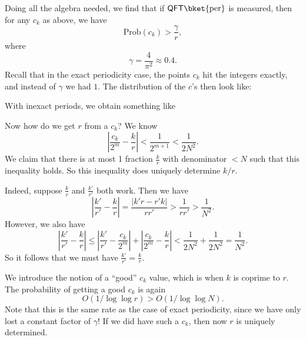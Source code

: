 \documentclass[a4paper]{article}
\newcommand{\qQFT}{\mathsf{QFT}}
\begin{document}
Doing all the algebra needed, we find that if $\qQFT\bket{\mathrm{per}}$ is measured, then for any $c_k$ as above, we have
\[
  \mathrm{Prob}(c_k) > \frac{\gamma}{r},
\]
where
\[
  \gamma = \frac{4}{\pi^2} \approx 0.4.
\]
Recall that in the exact periodicity case, the points $c_k$ hit the integers exactly, and instead of $\gamma$ we had $1$. The distribution of the $c$'s then look like:
\begin{center}
\end{center}
With inexact periods, we obtain something like
\begin{center}
\end{center}
Now how do we get $r$ from a $c_k$? We know
\[
  \left| \frac{c_k}{2^m} - \frac{k}{r}\right| < \frac{1}{2^{m + 1}} < \frac{1}{2N^2}.
\]
We claim that there is at most 1 fraction $\frac{k}{r}$ with denominator $< N$ such that this inequality holds. So this inequality does uniquely determine $k/r$.

Indeed, suppose $\frac{k}{r}$ and $\frac{k'}{r'}$ both work. Then we have
\[
  \left|\frac{k'}{r'} - \frac{k}{r}\right| = \frac{|k'r - r'k|}{rr'} > \frac{1}{rr'} > \frac{1}{N^2}.
\]
However, we also have
\[
  \left|\frac{k'}{r'} - \frac{k}{r}\right| \leq \left|\frac{k'}{r'} - \frac{c_k}{2^m}\right| + \left|\frac{c_k}{2^m} - \frac{k}{r}\right| < \frac{1}{2N^2} + \frac{1}{2N^2} = \frac{1}{N^2}.
\]
So it follows that we must have $\frac{k'}{r'} = \frac{k}{r}$.

We introduce the notion of a ``good'' $c_k$ value, which is when $k$ is coprime to $r$. The probability of getting a good $c_k$ is again
\[
  O(1/\log \log r) > O(1/\log \log N).
\]
Note that this is the same rate as the case of exact periodicity, since we have only lost a constant factor of $\gamma$! If we did have such a $c_k$, then now $r$ is uniquely determined.
\end{document}
